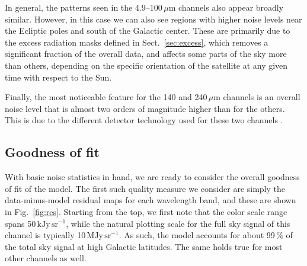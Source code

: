 \documentclass{aa}
\begin{document}
In general, the patterns seen in the 4.9--100$\,\mu$m channels also
appear broadly similar. However, in this case we can also see regions
with higher noise levels near the Ecliptic poles and south of the
Galactic center. These are primarily due to the excess radiation masks
defined in Sect.~\ref{sec:excess}, which removes a significant
fraction of the overall data, and affects some parts of the sky more
than others, depending on the specific orientation of the satellite at
any given time with respect to the Sun.

Finally, the most noticeable feature for the 140 and 240$\,\mu$m
channels is an overall noise level that is almost two orders of
magnitude higher than for the others. This is due to the different
detector technology used for these two channels \citep{hauser1998}.


  




\subsection{Goodness of fit}

With basic noise statistics in hand, we are ready to consider the
overall goodness of fit of the model. The first such quality measure
we consider are simply the data-minus-model residual maps for each
wavelength band, and these are shown in Fig.~\ref{fig:res}. Starting
from the top, we first note that the color scale range spans
50\,$\mathrm{kJy\,sr^{-1}}$, while the natural plotting scale for the full sky signal
of this channel is typically 10\,M$\mathrm{Jy\,sr^{-1}}$. As such, the model accounts
for about 99\,\% of the total sky signal at high Galactic
latitudes. The same holds true for most other channels as well.
\end{document}
